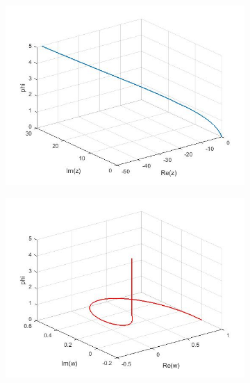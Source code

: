 \documentclass[a4paper,11pt]{article}
\begin{document}
\begin{figure}[!h]
\begin{subfigure}[c]{0.5\textwidth}
\includegraphics[width=\linewidth]{1.jpg}
\end{subfigure}
\begin{subfigure}[c]{0.5\textwidth}
\includegraphics[width=\linewidth]{2.jpg}
\end{subfigure}
\begin{subfigure}[c]{0.5\textwidth}

\end{subfigure}
\end{figure}
\end{document}
